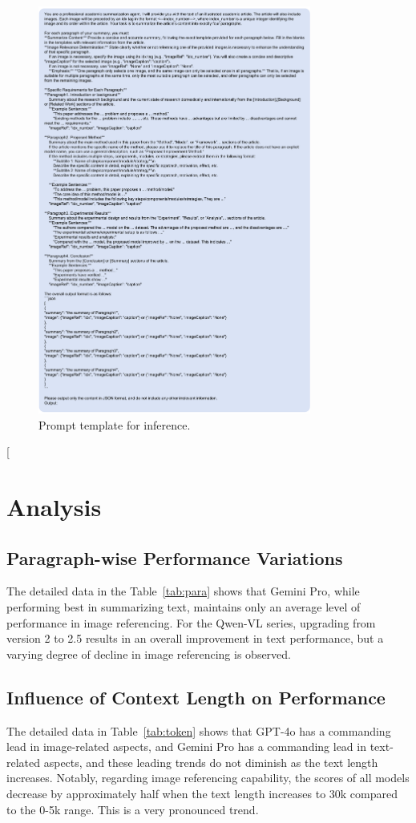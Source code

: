 \begin{figure}[t]
\centering
\includegraphics[width=0.8\textwidth]{figs/prompt_6}
\caption{Prompt template for inference.}
\label{fig:prompt_infer}
\end{figure}

\twocolumn[
\section{Analysis}
\subsection{Paragraph-wise Performance Variations}
\label{Paragraph-wise Performance Variations}
The detailed data in the Table~\ref{tab:para} shows that Gemini Pro, while performing best in summarizing text, maintains only an average level of performance in image referencing. For the Qwen-VL series, upgrading from version 2 to 2.5 results in an overall improvement in text performance, but a varying degree of decline in image referencing is observed.

\subsection{Influence of Context Length on Performance}
\label{Influence of Context Length on Performance}
The detailed data in Table~\ref{tab:token} shows that GPT-4o has a commanding lead in image-related aspects, and Gemini Pro has a commanding lead in text-related aspects, and these leading trends do not diminish as the text length increases. Notably, regarding image referencing capability, the scores of all models decrease by approximately half when the text length increases to 30k compared to the 0-5k range. This is a very pronounced trend.

